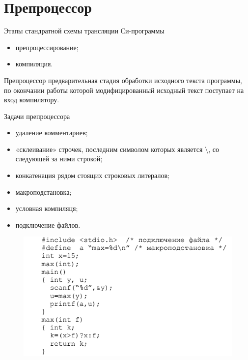 \documentclass{beamer}
\begin{document}
\section{Препроцессор}

\begin{frame}
Этапы стандратной схемы трансляции Си-программы
\begin{itemize}
\item препроцессирование;
\item компиляция.
\end{itemize}
\begin{block}{Препроцессор}
предварительная стадия обработки исходного текста программы, по окончании работы которой модифицированный исходный текст поступает на вход компилятору.
\end{block}
Задачи препроцессора
\begin{itemize}
\item удаление комментариев;
\item «склеивание» строчек, последним символом которых является $\setminus$, со следующей за ними строкой;
\item конкатенация рядом стоящих строковых литералов;
\item макроподстановка;
\item условная компиляця;
\item подключение файлов.
\end{itemize}
\end{frame}

\begin{frame}
\begin{figure}[h]
\centering
\includegraphics[scale=0.5]{images/lec03-pic14.png}
\end{figure}
\end{frame}
\end{document}
